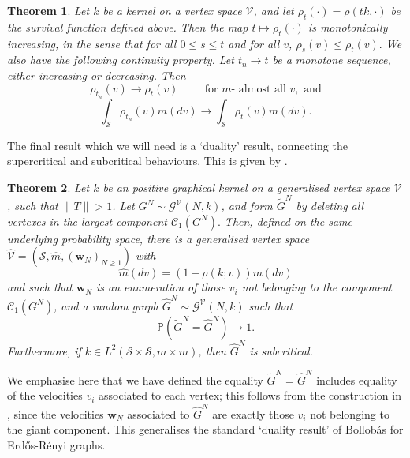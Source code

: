 \documentclass[11pt, notitlepage]{article}
\newtheorem{thm}{Theorem}[section]
\begin{document}
   \begin{thm}\label{thrm: continuity of rho} Let $k$ be a kernel on a vertex space $\mathcal{V}$, and let $\rho_t(\cdot)=\rho(tk,\cdot)$ be the survival function defined above. Then the map $t\mapsto \rho_t(\cdot)$ is monotonically increasing, in the sense that for all $0\leq s \leq t$ and for all $v$, $\rho_s(v)\le \rho_t(v).$ We also have the following continuity property. Let $t_n\rightarrow t$ be a monotone sequence, either increasing or decreasing. Then \begin{equation}
       \rho_{t_n}(v)\rightarrow \rho_t(v) \hspace{1cm} \text{for $m$- almost all }v, \text{ and}
   \end{equation} \begin{equation}
       \int_{\mathcal{S}}\rho_{t_n}(v)m(dv)\rightarrow \int_{\mathcal{S}}\rho_t(v)m(dv).
   \end{equation} \end{thm} The final result which we will need is a `duality' result, connecting the supercritical and subcritical behaviours. This is given by \cite[Theorem 12.1]{BJR07}.
   \begin{thm}\label{thrm: coupling supercritical and subcritical} Let $k$ be an positive graphical kernel on a generalised vertex space $\mathcal{V}$, such that $\|T\|>1$. Let $G^N \sim \mathcal{G}^\mathcal{V}(N, k)$, and form $\widetilde{G}^N$ by deleting all vertexes in the largest component $\mathcal{C}_1(G^N).$ Then, defined on the same underlying probability space, there is a generalised vertex space $\widehat{\mathcal{V}}=(\mathcal{S}, \widehat{m}, (\mathbf{w}_N)_{N\geq 1})$ with \begin{equation}
       \widehat{m}(dv)=(1-\rho(k;v))m(dv)
   \end{equation} and such that $\mathbf{w}_N$ is an enumeration of those $v_i$ not belonging to the component $\mathcal{C}_1(G^N)$, and a random graph $\widehat{G}^N \sim \mathcal{G}^{\widehat{\mathcal{V}}}(N,k)$ such that \begin{equation}
       \mathbb{P}(\widetilde{G}^N=\widehat{G}^N)\rightarrow 1.
   \end{equation}  Furthermore, if $k\in L^2(\mathcal{S}\times \mathcal{S}, m\times m)$, then $\widehat{G}^N$ is subcritical.\end{thm} We emphasise here that we have defined the equality $\widetilde{G}^N=\widehat{G}^N$ includes equality of the velocities $v_i$ associated to each vertex; this follows from the construction in \cite{BJR07}, since the velocities $\mathbf{w}_N$ associated to $\widehat{G}^N$ are exactly those $v_i$ not belonging to the giant component. This generalises the standard `duality result' of Bollob\'as \cite{BB84} for Erd\H{o}s-R\'enyi graphs. 
\end{document}
